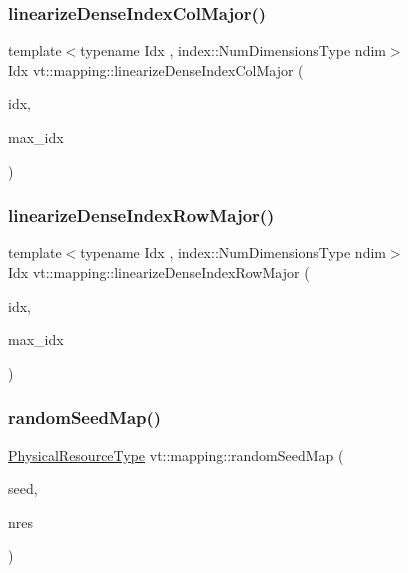 \subsubsection{\texorpdfstring{linearize\+Dense\+Index\+Col\+Major()}{linearizeDenseIndexColMajor()}}
{\footnotesize\ttfamily template$<$typename Idx , index\+::\+Num\+Dimensions\+Type ndim$>$ \\
Idx vt\+::mapping\+::linearize\+Dense\+Index\+Col\+Major (\begin{DoxyParamCaption}\item[{\hyperlink{namespacevt_ac016d9c31465ce11c14eab2be11f9183}{Dense\+Index}$<$ Idx, ndim $>$ $\ast$}]{idx,  }\item[{\hyperlink{namespacevt_ac016d9c31465ce11c14eab2be11f9183}{Dense\+Index}$<$ Idx, ndim $>$ $\ast$}]{max\+\_\+idx }\end{DoxyParamCaption})}

\mbox{\label{namespacevt_1_1mapping_abcd5f8f5e5c974ef83eaa87eeeb416a6}} 
\subsubsection{\texorpdfstring{linearize\+Dense\+Index\+Row\+Major()}{linearizeDenseIndexRowMajor()}}
{\footnotesize\ttfamily template$<$typename Idx , index\+::\+Num\+Dimensions\+Type ndim$>$ \\
Idx vt\+::mapping\+::linearize\+Dense\+Index\+Row\+Major (\begin{DoxyParamCaption}\item[{\hyperlink{namespacevt_ac016d9c31465ce11c14eab2be11f9183}{Dense\+Index}$<$ Idx, ndim $>$ $\ast$}]{idx,  }\item[{\hyperlink{namespacevt_ac016d9c31465ce11c14eab2be11f9183}{Dense\+Index}$<$ Idx, ndim $>$ $\ast$}]{max\+\_\+idx }\end{DoxyParamCaption})}

\mbox{\label{namespacevt_1_1mapping_ab517203040d5d053a2293de5ea58bcf1}} 
\subsubsection{\texorpdfstring{random\+Seed\+Map()}{randomSeedMap()}}
{\footnotesize\ttfamily \hyperlink{namespacevt_a2dc36fcada816dc6d11774d650328ee9}{Physical\+Resource\+Type} vt\+::mapping\+::random\+Seed\+Map (\begin{DoxyParamCaption}\item[{\hyperlink{namespacevt_ae2e13198bdef4d5b8e603d6c1c7f0969}{Seed\+Type}}]{seed,  }\item[{\hyperlink{namespacevt_a2dc36fcada816dc6d11774d650328ee9}{Physical\+Resource\+Type}}]{nres }\end{DoxyParamCaption})}

